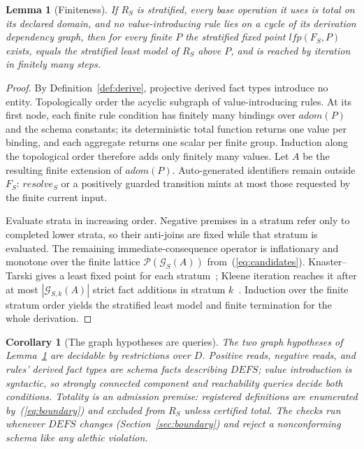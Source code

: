 \documentclass[10pt,twocolumn]{article}
\theoremstyle{plain}
\newtheorem{lemma}{Lemma}
\newtheorem{corollary}{Corollary}
\theoremstyle{definition}
\begin{document}
\begin{lemma}[Finiteness]\label{lem:finite}
If $R_S$ is stratified, every base operation it uses is total on its declared domain, and no value-introducing rule lies on a cycle of its derivation dependency graph, then for every finite $P$ the stratified fixed point $\mathit{lfp}(F_S,P)$ exists, equals the stratified least model of $R_S$ above $P$, and is reached by iteration in finitely many steps.
\end{lemma}
\begin{proof}
By Definition~\ref{def:derive}, projective derived fact types introduce no entity. Topologically order the acyclic subgraph of value-introducing rules. At its first node, each finite rule condition has finitely many bindings over $\mathit{adom}(P)$ and the schema constants; its deterministic total function returns one value per binding, and each aggregate returns one scalar per finite group. Induction along the topological order therefore adds only finitely many values. Let $A$ be the resulting finite extension of $\mathit{adom}(P)$. Auto-generated identifiers remain outside $F_S$: $\mathit{resolve}_S$ or a positively guarded transition mints at most those requested by the finite current input.

Evaluate strata in increasing order. Negative premises in a stratum refer only to completed lower strata, so their anti-joins are fixed while that stratum is evaluated. The remaining immediate-consequence operator is inflationary and monotone over the finite lattice $\mathcal{P}(\mathcal{G}_S(A))$ from~(\ref{eq:candidates}). Knaster--Tarski gives a least fixed point for each stratum~\cite{tarski55}; Kleene iteration reaches it after at most $|\mathcal{G}_{S,k}(A)|$ strict fact additions in stratum $k$~\cite{kleene52}. Induction over the finite stratum order yields the stratified least model and finite termination for the whole derivation.
\end{proof}

\begin{corollary}[The graph hypotheses are queries]\label{cor:finitecheck}
The two graph hypotheses of Lemma~\ref{lem:finite} are decidable by restrictions over $D$. Positive reads, negative reads, and rules' derived fact types are schema facts describing $\mathit{DEFS}$; value introduction is syntactic, so strongly connected component and reachability queries decide both conditions. Totality is an admission premise: registered definitions are enumerated by~(\ref{eq:boundary}) and excluded from $R_S$ unless certified total. The checks run whenever $\mathit{DEFS}$ changes (Section~\ref{sec:boundary}) and reject a nonconforming schema like any alethic violation.
\end{corollary}
\end{document}
